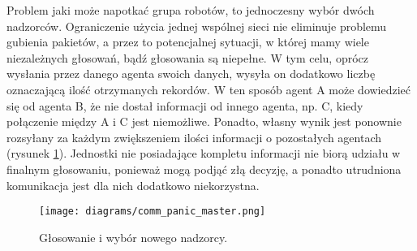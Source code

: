 Problem jaki może napotkać grupa robotów, to jednoczesny wybór dwóch nadzorców. Ograniczenie użycia jednej wspólnej sieci nie eliminuje problemu gubienia pakietów, a przez to potencjalnej sytuacji, w której mamy wiele niezależnych głosowań, bądź głosowania są niepełne. W tym celu, oprócz wysłania przez danego agenta swoich danych, wysyła on dodatkowo liczbę oznaczającą ilość otrzymanych rekordów. W ten sposób agent A może dowiedzieć się od agenta B, że nie dostał informacji od innego agenta, np. C, kiedy połączenie między A i C jest niemożliwe. Ponadto, własny wynik jest ponownie rozsyłany za każdym zwiększeniem ilości informacji o pozostałych agentach (rysunek \ref{fig:comm_panic_master}). Jednostki nie posiadające kompletu informacji nie biorą udziału w finalnym głosowaniu, ponieważ mogą podjąć złą decyzję, a ponadto utrudniona komunikacja jest dla nich dodatkowo niekorzystna.

\begin{figure}[!ht]
    \centering
        \texttt{[image: diagrams/comm\_panic\_master.png]}
    \caption{Głosowanie i wybór nowego nadzorcy.\label{fig:comm_panic_master}}
\end{figure}
